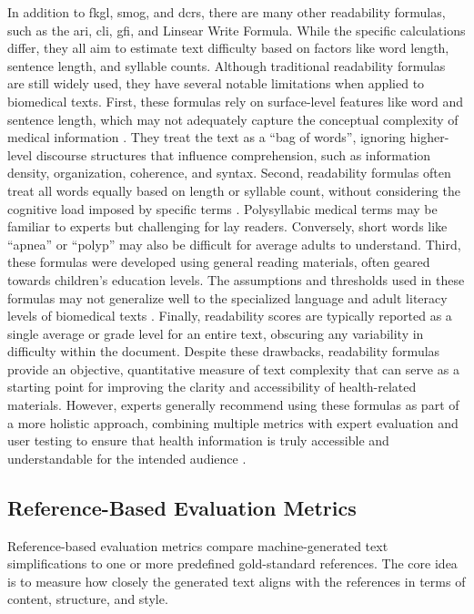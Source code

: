 In addition to \gls{fkgl}, \gls{smog}, and \gls{dcrs}, there are many other readability formulas, such as the \gls{ari}, \gls{cli}, \gls{gfi}, and Linsear Write Formula. While the specific calculations differ, they all aim to estimate text difficulty based on factors like word length, sentence length, and syllable counts.
Although traditional readability formulas are still widely used, they have several notable limitations when applied to biomedical texts. 
First, these formulas rely on surface-level features like word and sentence length, which may not adequately capture the conceptual complexity of medical information \cite{Crossley2022, WANG2013503, Singh2024}.
They treat the text as a ``bag of words'', ignoring higher-level discourse structures that influence comprehension, such as information density, organization, coherence, and syntax.  
Second, readability formulas often treat all words equally based on length or syllable count, without considering the cognitive load imposed by specific terms \cite{Swanson2024}. 
Polysyllabic medical terms may be familiar to experts but challenging for lay readers. Conversely, short words like ``apnea'' or ``polyp'' may also be difficult for average adults to understand.
Third, these formulas were developed using general reading materials, often geared towards children's education levels. 
The assumptions and thresholds used in these formulas may not generalize well to the specialized language and adult literacy levels of biomedical texts \cite{Crossley2022}.
Finally, readability scores are typically reported as a single average or grade level for an entire text, obscuring any variability in difficulty within the document.
Despite these drawbacks, readability formulas provide an objective, quantitative measure of text complexity that can serve as a starting point for improving the clarity and accessibility of health-related materials. 
However, experts generally recommend using these formulas as part of a more holistic approach, combining multiple metrics with expert evaluation and user testing to ensure that health information is truly accessible and understandable for the intended audience \cite{Ko2024-dd, tanprasert-kauchak-2021-flesch}.

\subsection{Reference-Based Evaluation Metrics}

Reference-based evaluation metrics compare machine-generated text simplifications to one or more predefined gold-standard references.
The core idea is to measure how closely the generated text aligns with the references in terms of content, structure, and style.

